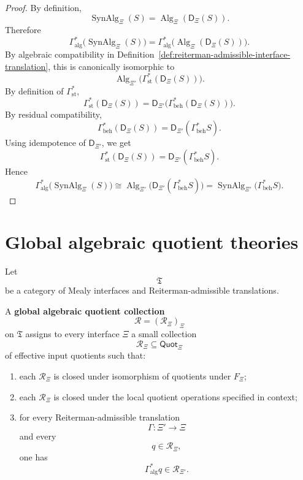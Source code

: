 \begin{proof}
By definition,
\[
\operatorname{SynAlg}_{\Xi}(S)
=
\operatorname{Alg}_{\Xi}(\mathsf D_\Xi(S)).
\]
Therefore
\[
\Gamma_{\mathrm{alg}}^\ast
\bigl(
\operatorname{SynAlg}_{\Xi}(S)
\bigr)
=
\Gamma_{\mathrm{alg}}^\ast
\bigl(
\operatorname{Alg}_{\Xi}(\mathsf D_\Xi(S))
\bigr).
\]
By algebraic compatibility in
Definition~\ref{def:reiterman-admissible-interface-translation}, this is
canonically isomorphic to
\[
\operatorname{Alg}_{\Xi'}
\bigl(
\Gamma_{\mathrm{st}}^\ast(\mathsf D_\Xi(S))
\bigr).
\]
By definition of \(\Gamma_{\mathrm{st}}^\ast\),
\[
\Gamma_{\mathrm{st}}^\ast(\mathsf D_\Xi(S))
=
\mathsf D_{\Xi'}
\bigl(
\Gamma_{\mathrm{beh}}^\ast(\mathsf D_\Xi(S))
\bigr).
\]
By residual compatibility,
\[
\Gamma_{\mathrm{beh}}^\ast(\mathsf D_\Xi(S))
=
\mathsf D_{\Xi'}(\Gamma_{\mathrm{beh}}^\ast S).
\]
Using idempotence of \(\mathsf D_{\Xi'}\), we get
\[
\Gamma_{\mathrm{st}}^\ast(\mathsf D_\Xi(S))
=
\mathsf D_{\Xi'}(\Gamma_{\mathrm{beh}}^\ast S).
\]
Hence
\[
\Gamma_{\mathrm{alg}}^\ast
\bigl(
\operatorname{SynAlg}_{\Xi}(S)
\bigr)
\cong
\operatorname{Alg}_{\Xi'}
\bigl(
\mathsf D_{\Xi'}(\Gamma_{\mathrm{beh}}^\ast S)
\bigr)
=
\operatorname{SynAlg}_{\Xi'}
\bigl(
\Gamma_{\mathrm{beh}}^\ast S
\bigr).
\]
\end{proof}

\section{Global algebraic quotient theories}
\label{sec:reiterman-global-algebraic-quotient-theories}

Let
\[
\mathfrak T
\]
be a category of Mealy interfaces and Reiterman-admissible translations.

\begin{definition}
\label{def:reiterman-global-algebraic-quotient-collection}
A \textbf{global algebraic quotient collection}
\[
\mathcal R=(\mathcal R_\Xi)_\Xi
\]
on \(\mathfrak T\) assigns to every interface \(\Xi\) a small collection
\[
\mathcal R_\Xi\subseteq\mathsf{Quot}_\Xi
\]
of effective input quotients such that:
\begin{enumerate}
\item each \(\mathcal R_\Xi\) is closed under isomorphism of quotients under
\(F_\Xi\);
\item each \(\mathcal R_\Xi\) is closed under the local quotient operations
specified in context;
\item for every Reiterman-admissible translation
\[
\Gamma:\Xi'\to\Xi
\]
and every
\[
q\in\mathcal R_\Xi,
\]
one has
\[
\Gamma_{\mathrm{alg}}^\ast q\in\mathcal R_{\Xi'}.
\]
\end{enumerate}
\end{definition}

